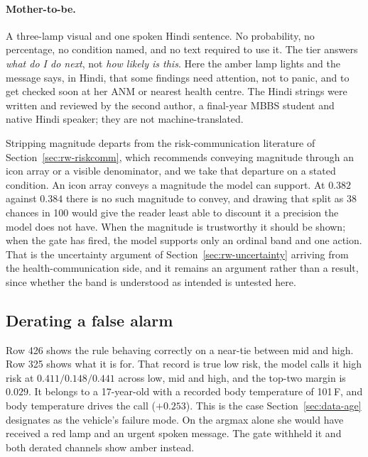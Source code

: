 \paragraph{Mother-to-be.} A three-lamp visual and one spoken Hindi sentence.
No probability, no percentage, no condition named, and no text required to
use it. The tier answers \emph{what do I do next}, not \emph{how likely is
this}. Here the amber lamp lights and the message says, in Hindi, that some
findings need attention, not to panic, and to get checked soon at her ANM or
nearest health centre. The Hindi
strings were written and reviewed by the second author, a final-year MBBS
student and native Hindi speaker; they are not machine-translated.

Stripping magnitude departs from the risk-communication literature of
Section~\ref{sec:rw-riskcomm}, which recommends conveying magnitude through an
icon array or a visible denominator, and we take that departure on a stated
condition. An icon array conveys a magnitude the model can support. At
$0.382$ against $0.384$ there is no such magnitude to convey, and drawing that
split as 38 chances in 100 would give the reader least able to discount it a
precision the model does not have. When the magnitude is trustworthy it should
be shown; when the gate has fired, the model supports only an ordinal band and
one action. That is the uncertainty argument of Section~\ref{sec:rw-uncertainty} arriving
from the health-communication side, and it remains an argument rather than a
result, since whether the band is understood as intended is untested here.

\subsection{Derating a false alarm}
\label{sec:tiers-failure}

Row 426 shows the rule behaving correctly on a near-tie between mid and high.
Row 325 shows what it is for. That record is true low risk, the model calls it
high risk at $0.411 / 0.148 / 0.441$ across low, mid and high, and the top-two
margin is $0.029$. It belongs to a 17-year-old with a recorded body
temperature of 101\,\textdegree F, and body temperature drives the call
($+0.253$). This is the case Section~\ref{sec:data-age} designates as the
vehicle's failure mode. On the argmax alone she would have received a red lamp
and an urgent spoken message. The gate withheld it and both derated channels
show amber instead.


